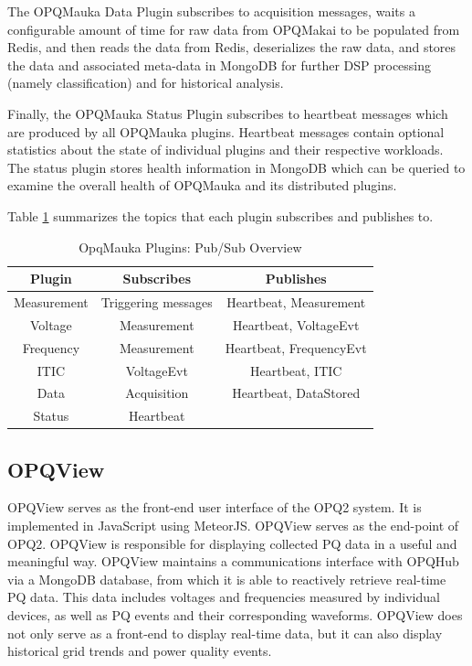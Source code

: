 \documentclass[a4paper, conference]{IEEEtran}
\begin{document}
The OPQMauka Data Plugin subscribes to acquisition messages, waits a configurable amount of time for raw data from OPQMakai to be populated from Redis, and then reads the data from Redis, deserializes the raw data, and stores the data and associated meta-data in MongoDB for further DSP processing (namely classification) and for historical analysis. 

Finally, the OPQMauka Status Plugin subscribes to heartbeat messages which are produced by all OPQMauka plugins. Heartbeat messages contain optional statistics about the state of individual plugins and their respective workloads. The status plugin stores health information in MongoDB which can be queried to examine the overall health of OPQMauka and its distributed plugins.

Table \ref{table:opqmauka} summarizes the topics that each plugin subscribes and publishes to.

\begin{table}
	\begin{tabular}{|c|c|c|}
		\hline 
		Plugin & Subscribes & Publishes \\ 
		\hline 
		Measurement  & Triggering messages & Heartbeat, Measurement \\ 
		\hline 
		Voltage & Measurement & Heartbeat, VoltageEvt \\ 
		\hline 
		Frequency  & Measurement & Heartbeat, FrequencyEvt \\ 
		\hline 
		ITIC &  VoltageEvt & Heartbeat, ITIC \\ 
		\hline 
		Data &  Acquisition & Heartbeat, DataStored \\ 
		\hline 
		Status & Heartbeat &  \\ 
		\hline 
	\end{tabular}
	\caption{OpqMauka Plugins: Pub/Sub Overview}
	\label{table:opqmauka}
\end{table}
 
\subsection{OPQView}
OPQView serves as the front-end user interface of the OPQ2 system. It is implemented in JavaScript using MeteorJS. OPQView serves as the end-point of OPQ2. OPQView is responsible for displaying collected PQ data in a useful and meaningful way. OPQView maintains a communications interface with OPQHub via a MongoDB database, from which it is able to reactively retrieve real-time PQ data. This data includes voltages and frequencies measured by individual devices, as well as PQ events and their corresponding waveforms.  OPQView does not only serve as a front-end to display real-time data, but it can also display historical grid trends and power quality events. 
\end{document}
